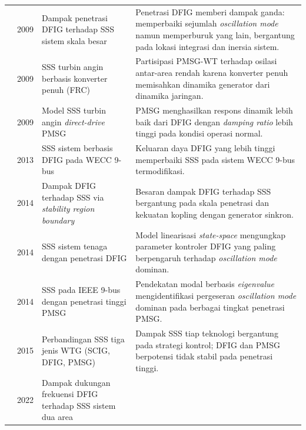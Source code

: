 \begin{longtable}{p{1.8cm} p{1.2cm} p{3.6cm} p{7.0cm}}
\cite{gautam2009impact} & 2009 &
Dampak penetrasi DFIG terhadap SSS sistem skala besar &
Penetrasi DFIG memberi dampak ganda: memperbaiki sejumlah
\textit{oscillation mode} namun memperburuk yang lain, bergantung pada lokasi
integrasi dan inersia sistem. \\
\noalign{\vspace{4pt}}
\cite{knuppel2009small} & 2009 &
SSS turbin angin berbasis konverter penuh (FRC) &
Partisipasi PMSG-WT terhadap osilasi antar-area rendah karena konverter penuh
memisahkan dinamika generator dari dinamika jaringan. \\
\noalign{\vspace{4pt}}
\cite{wu2009small} & 2009 &
Model SSS turbin angin \textit{direct-drive} PMSG &
PMSG menghasilkan respons dinamik lebih baik dari DFIG dengan
\textit{damping ratio} lebih tinggi pada kondisi operasi normal. \\
\noalign{\vspace{4pt}}
\cite{sun2013small} & 2013 &
SSS sistem berbasis DFIG pada WECC 9-bus &
Keluaran daya DFIG yang lebih tinggi memperbaiki SSS pada sistem WECC 9-bus
termodifikasi. \\
\noalign{\vspace{4pt}}
\cite{liu2014impact} & 2014 &
Dampak DFIG terhadap SSS via \textit{stability region boundary} &
Besaran dampak DFIG terhadap SSS bergantung pada skala penetrasi dan kekuatan
kopling dengan generator sinkron. \\
\noalign{\vspace{4pt}}
\cite{mehta2014} & 2014 &
SSS sistem tenaga dengan penetrasi DFIG &
Model linearisasi \textit{state-space} mengungkap parameter kontroler DFIG
yang paling berpengaruh terhadap \textit{oscillation mode} dominan. \\
\noalign{\vspace{4pt}}
\cite{wang2014small} & 2014 &
SSS pada IEEE 9-bus dengan penetrasi tinggi PMSG &
Pendekatan modal berbasis \textit{eigenvalue} mengidentifikasi pergeseran
\textit{oscillation mode} dominan pada berbagai tingkat penetrasi PMSG. \\
\noalign{\vspace{4pt}}
\cite{he2015investigation} & 2015 &
Perbandingan SSS tiga jenis WTG (SCIG, DFIG, PMSG) &
Dampak SSS tiap teknologi bergantung pada strategi kontrol; DFIG dan PMSG
berpotensi tidak stabil pada penetrasi tinggi. \\
\noalign{\vspace{4pt}}
\cite{pepiciello2022impact} & 2022 &
Dampak dukungan frekuensi DFIG terhadap SSS sistem dua area &

\end{longtable}
